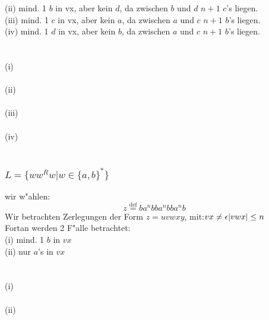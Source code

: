 \documentclass{article}
\newcommand{\gap}{\null\ \\ \\}
\newcommand{\eps}{\epsilon}
\newcommand{\mdef}{\overset{\text{def}}{=}}
\begin{document}
(ii) mind. 1 $b$ in vx, aber kein $d$,
    da zwischen $b$ und $d$ $n+1$ $c$'s liegen.\\

(iii) mind. 1 $c$ in vx, aber kein $a$,
    da zwischen $a$ und $c$ $n+1$ $b$'s liegen.\\

(iv) mind. 1 $d$ in vx, aber kein $b$,
    da zwischen $a$ und $c$ $n+1$ $b$'s liegen.\\
\gap
(i)\\
\\
(ii)\\
\\
(iii)\\
\\
(iv)\\
\\

\subsubsection{$L = \{ww^Rw | w \in \{a,b\}^*\}$}

wir w"ahlen:\[
    z \mdef ba^nbba^nbba^nb
\]
Wir betrachten Zerlegungen der Form $z = uvwxy$, mit:$\\
    vx \neq \eps\\
    |vwx| \leq n\\
$\\
Fortan werden 2 F"alle betrachtet:\\
(i) mind. 1 $b$ in $vx$\\
(ii) nur $a$'s in $vx$\\
\gap
(i)\\
\\
(ii)\\
\end{document}
